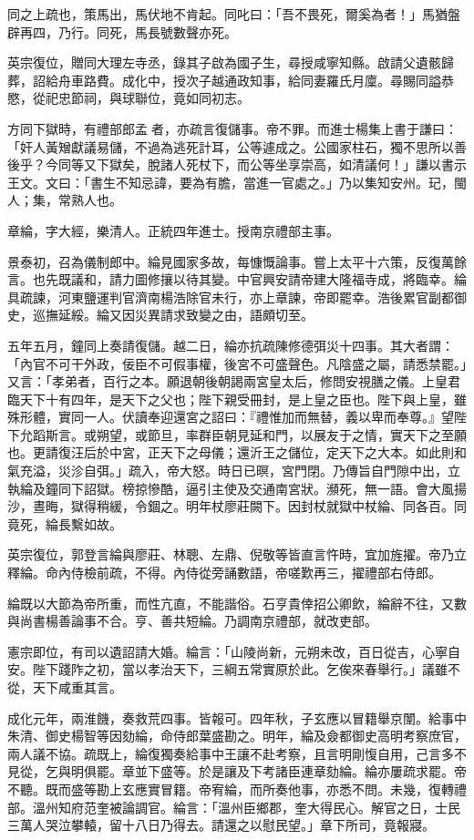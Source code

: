 \begin{pinyinscope}
同之上疏也，策馬出，馬伏地不肯起。同叱曰：「吾不畏死，爾奚為者！」馬猶盤辟再四，乃行。同死，馬長號數聲亦死。

英宗復位，贈同大理左寺丞，錄其子啟為國子生，尋授咸寧知縣。啟請父遺骸歸葬，詔給舟車路費。成化中，授次子越通政知事，給同妻羅氏月廩。尋賜同謚恭愍，從祀忠節祠，與球聯位，竟如同初志。

方同下獄時，有禮部郎孟者，亦疏言復儲事。帝不罪。而進士楊集上書于謙曰：「奸人黃矰獻議易儲，不過為逃死計耳，公等遽成之。公國家柱石，獨不思所以善後乎？今同等又下獄矣，脫諸人死杖下，而公等坐享崇高，如清議何！」謙以書示王文。文曰：「書生不知忌諱，要為有膽，當進一官處之。」乃以集知安州。玘，閩人；集，常熟人也。

章綸，字大經，樂清人。正統四年進士。授南京禮部主事。

景泰初，召為儀制郎中。綸見國家多故，每慷慨論事。嘗上太平十六策，反復萬餘言。也先既議和，請力圖修攘以待其變。中官興安請帝建大隆福寺成，將臨幸。綸具疏諫，河東鹽運判官濟南楊浩除官未行，亦上章諫，帝即罷幸。浩後累官副都御史，巡撫延綏。綸又因災異請求致變之由，語頗切至。

五年五月，鐘同上奏請復儲。越二日，綸亦抗疏陳修德弭災十四事。其大者謂：「內官不可干外政，佞臣不可假事權，後宮不可盛聲色。凡陰盛之屬，請悉禁罷。」又言：「孝弟者，百行之本。願退朝後朝謁兩宮皇太后，修問安視膳之儀。上皇君臨天下十有四年，是天下之父也；陛下親受冊封，是上皇之臣也。陛下與上皇，雖殊形體，實同一人。伏讀奉迎還宮之詔曰：『禮惟加而無替，義以卑而奉尊。』望陛下允蹈斯言。或朔望，或節旦，率群臣朝見延和門，以展友于之情，實天下之至願也。更請復汪后於中宮，正天下之母儀；還沂王之儲位，定天下之大本。如此則和氣充溢，災沴自弭。」疏入，帝大怒。時日已暝，宮門閉。乃傳旨自門隙中出，立執綸及鐘同下詔獄。榜掠慘酷，逼引主使及交通南宮狀。瀕死，無一語。會大風揚沙，晝晦，獄得稍緩，令錮之。明年杖廖莊闕下。因封杖就獄中杖綸、同各百。同竟死，綸長繫如故。

英宗復位，郭登言綸與廖莊、林聰、左鼎、倪敬等皆直言忤時，宜加旌擢。帝乃立釋綸。命內侍檢前疏，不得。內侍從旁誦數語，帝嗟歎再三，擢禮部右侍郎。

綸既以大節為帝所重，而性亢直，不能諧俗。石亨貴倖招公卿飲，綸辭不往，又數與尚書楊善論事不合。亨、善共短綸。乃調南京禮部，就改吏部。

憲宗即位，有司以遺詔請大婚。綸言：「山陵尚新，元朔未改，百日從吉，心寧自安。陛下踐阼之初，當以孝治天下，三綱五常實原於此。乞俟來春舉行。」議雖不從，天下咸重其言。

成化元年，兩淮饑，奏救荒四事。皆報可。四年秋，子玄應以冒籍舉京闈。給事中朱清、御史楊智等因劾綸，命侍郎葉盛勘之。明年，綸及僉都御史高明考察庶官，兩人議不協。疏既上，綸復獨奏給事中王讓不赴考察，且言明剛愎自用，己言多不見從，乞與明俱罷。章並下盛等。於是讓及下考諸臣連章劾綸。綸亦屢疏求罷。帝不聽。既而盛等勘上玄應實冒籍。帝宥綸，而所奏他事，亦悉不問。未幾，復轉禮部。溫州知府范奎被論調官。綸言：「溫州臣鄉郡，奎大得民心。解官之日，士民三萬人哭泣攀轅，留十八日乃得去。請還之以慰民望。」章下所司，竟報寢。


\end{pinyinscope}
